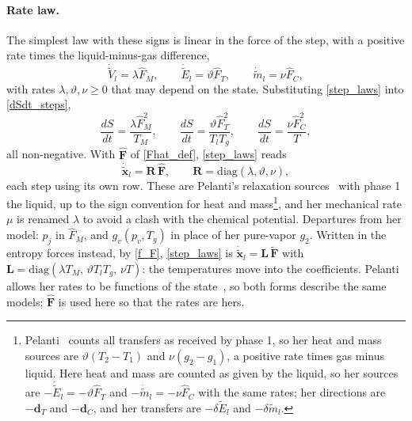 \paragraph{Rate law.}
The simplest law with these signs is linear in the force of the step, with a positive rate times the liquid-minus-gas difference,
\begin{equation}\label{step_laws}
\dot{\tilde{V}}_l=\lambda \hat{F}_M,\qquad \dot{\tilde{E}}_l=\vartheta \hat{F}_T,\qquad \dot{\tilde{m}}_l=\nu \hat{F}_C,
\end{equation}
with rates $\lambda,\vartheta,\nu\ge0$ that may depend on the state. Substituting \eqref{step_laws} into \eqref{dSdt_steps},
\begin{equation}\label{dSdt_rates}
\frac{dS}{dt}=\frac{\lambda \hat{F}_M^2}{T_M},\qquad \frac{dS}{dt}=\frac{\vartheta \hat{F}_T^2}{T_lT_g},\qquad \frac{dS}{dt}=\frac{\nu \hat{F}_C^2}{T},
\end{equation}
all non-negative. With $\hat{\boldsymbol{F}}$ of \eqref{Fhat_def}, \eqref{step_laws} reads
\begin{equation}\label{rate_matrix}
\dot{\tilde{\boldsymbol{x}}}_l=\boldsymbol{R}\,\hat{\boldsymbol{F}},\qquad \boldsymbol{R}=\mathrm{diag}(\lambda,\vartheta,\nu),
\end{equation}
each step using its own row. These are Pelanti's relaxation sources~\cite[eq.~(2)]{Pelanti2022} with phase 1 the liquid, up to the sign convention for heat and mass\footnote{\label{fn_sign}Pelanti~\cite[eq.~(2)]{Pelanti2022} counts all transfers as received by phase 1, so her heat and mass sources are $\vartheta(T_2-T_1)$ and $\nu(g_2-g_1)$, a positive rate times gas minus liquid. Here heat and mass are counted as given by the liquid, so her sources are $-\dot{\tilde{E}}_l=-\vartheta \hat{F}_T$ and $-\dot{\tilde{m}}_l=-\nu \hat{F}_C$ with the same rates; her directions are $-\boldsymbol{d}_T$ and $-\boldsymbol{d}_C$, and her transfers are $-\delta\tilde{E}_l$ and $-\delta\tilde{m}_l$.}, and her mechanical rate $\mu$ is renamed $\lambda$ to avoid a clash with the chemical potential. Departures from her model: $p_{j}$ in $\hat{F}_M$, and $g_v(p_v,T_g)$ in place of her pure-vapor $g_2$. Written in the entropy forces instead, by \eqref{f_F}, \eqref{step_laws} is $\dot{\tilde{\boldsymbol{x}}}_l=\boldsymbol{L}\,\tilde{\boldsymbol{F}}$ with $\boldsymbol{L}=\mathrm{diag}(\lambda T_M,\,\vartheta T_lT_g,\,\nu T)$: the temperatures move into the coefficients. Pelanti allows her rates to be functions of the state~\cite[after eq.~(2)]{Pelanti2022}, so both forms describe the same models; $\hat{\boldsymbol{F}}$ is used here so that the rates are hers.

